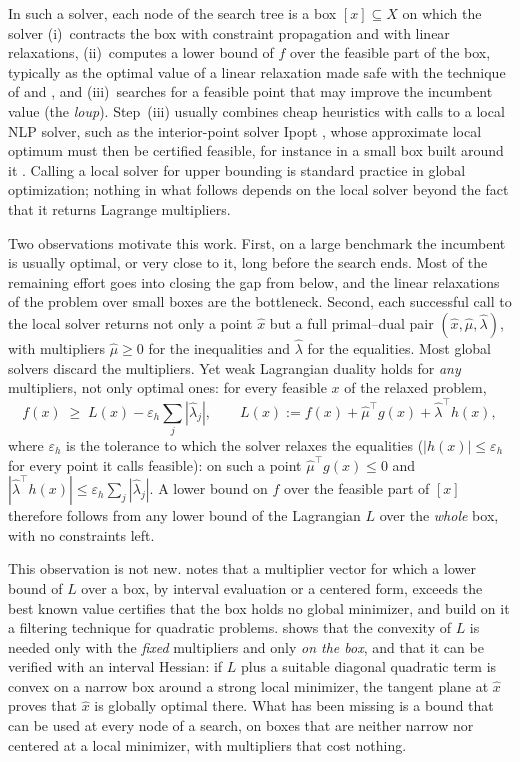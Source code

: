 \documentclass[11pt]{article}
\begin{document}
In such a solver, each node of the search tree is a box $[x] \subseteq X$ on which the
solver (i)~contracts the box with constraint propagation and with linear relaxations,
(ii)~computes a lower bound of $f$ over the feasible part of the box, typically as the
optimal value of a linear relaxation made safe with the technique of
\citet{NeumaierShcherbina2004} and \citet{Jansson2004lp}, and (iii)~searches for a
feasible point that may improve the incumbent value (the \emph{loup}). Step~(iii)
usually combines cheap heuristics with calls to a local NLP solver, such as the
interior-point solver Ipopt \citep{WachterBiegler2006}, whose approximate local optimum
must then be certified feasible, for instance in a small box built around it
\citep{Kearfott2014}. Calling a local solver for upper bounding is standard practice in
global optimization; nothing in what follows depends on the local solver beyond the fact
that it returns Lagrange multipliers.

Two observations motivate this work. First, on a large benchmark the incumbent is usually
optimal, or very close to it, long before the search ends. Most of the remaining effort
goes into closing the gap from below, and the linear relaxations of the problem over
small boxes are the bottleneck. Second, each successful call to the local solver returns not only a
point $\hat x$ but a full primal--dual pair $(\hat x, \hat\mu, \hat\lambda)$, with
multipliers $\hat\mu \ge 0$ for the inequalities and $\hat\lambda$ for the equalities.
Most global solvers discard the multipliers. Yet weak Lagrangian duality holds for
\emph{any} multipliers, not only optimal ones: for every feasible $x$ of the relaxed
problem,
\begin{equation}\label{eq:weak}
  f(x) \;\ge\; L(x) - \varepsilon_h \textstyle\sum_j |\hat\lambda_j|,
  \qquad L(x) := f(x) + \hat\mu^\top g(x) + \hat\lambda^\top h(x),
\end{equation}
where $\varepsilon_h$ is the tolerance to which the solver relaxes the equalities
($|h(x)| \le \varepsilon_h$ for every point it calls feasible): on such a point
$\hat\mu^\top g(x) \le 0$ and $|\hat\lambda^\top h(x)| \le \varepsilon_h \sum_j |\hat\lambda_j|$.
A lower bound on $f$ over the feasible part of $[x]$ therefore follows from any lower
bound of the Lagrangian $L$ over the \emph{whole} box, with no constraints left.

This observation is not new. \citet[Sect.~20]{Neumaier2004} notes that a multiplier
vector for which a lower bound of $L$ over a box, by interval evaluation or a centered
form, exceeds the best known value certifies that the box holds no global minimizer,
and \citet{DomesNeumaier2016} build on it a filtering technique for quadratic problems.
\citet{Neumaier1996} shows that the convexity of $L$ is needed only with the
\emph{fixed} multipliers and only \emph{on the box}, and that it can be verified with
an interval Hessian: if $L$ plus a suitable diagonal quadratic term is convex on a
narrow box around a strong local minimizer, the tangent plane at $\hat x$ proves that
$\hat x$ is globally optimal there. What has been missing is a bound that can be used
at every node of a search, on boxes that are neither narrow nor centered at a local
minimizer, with multipliers that cost nothing.
\end{document}
